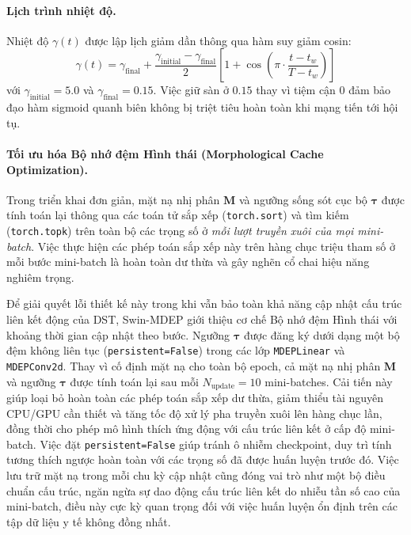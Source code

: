 \documentclass[11pt, a4paper]{article}
\begin{document}
\paragraph{Lịch trình nhiệt độ.}
Nhiệt độ $\gamma(t)$ được lập lịch giảm dần thông qua hàm suy giảm cosin:
\begin{equation}\label{eq:gamma_schedule}
    \gamma(t) = \gamma_{\text{final}} + \frac{\gamma_{\text{initial}} - \gamma_{\text{final}}}{2}\left[1 + \cos\!\left(\pi \cdot \frac{t - t_w}{T - t_w}\right)\right]
\end{equation}
với $\gamma_{\text{initial}} = 5.0$ và $\gamma_{\text{final}} = 0.15$. Việc giữ sàn ở $0.15$ thay vì tiệm cận $0$ đảm bảo đạo hàm sigmoid quanh biên không bị triệt tiêu hoàn toàn khi mạng tiến tới hội tụ.

\paragraph{Tối ưu hóa Bộ nhớ đệm Hình thái (Morphological Cache Optimization).}
Trong triển khai đơn giản, mặt nạ nhị phân $\bm{M}$ và ngưỡng sống sót cục bộ $\bm{\tau}$ được tính toán lại thông qua các toán tử sắp xếp (\texttt{torch.sort}) và tìm kiếm (\texttt{torch.topk}) trên toàn bộ các trọng số ở \emph{mỗi lượt truyền xuôi của mọi mini-batch}. Việc thực hiện các phép toán sắp xếp này trên hàng chục triệu tham số ở mỗi bước mini-batch là hoàn toàn dư thừa và gây nghẽn cổ chai hiệu năng nghiêm trọng.

Để giải quyết lỗi thiết kế này trong khi vẫn bảo toàn khả năng cập nhật cấu trúc liên kết động của DST, Swin-MDEP giới thiệu cơ chế Bộ nhớ đệm Hình thái với khoảng thời gian cập nhật theo bước. Ngưỡng $\bm{\tau}$ được đăng ký dưới dạng một bộ đệm không liên tục (\texttt{persistent=False}) trong các lớp \texttt{MDEPLinear} và \texttt{MDEPConv2d}. Thay vì cố định mặt nạ cho toàn bộ epoch, cả mặt nạ nhị phân $\bm{M}$ và ngưỡng $\bm{\tau}$ được tính toán lại sau mỗi $N_{\text{update}} = 10$ mini-batches. Cải tiến này giúp loại bỏ hoàn toàn các phép toán sắp xếp dư thừa, giảm thiểu tài nguyên CPU/GPU cần thiết và tăng tốc độ xử lý pha truyền xuôi lên hàng chục lần, đồng thời cho phép mô hình thích ứng động với cấu trúc liên kết ở cấp độ mini-batch. Việc đặt \texttt{persistent=False} giúp tránh ô nhiễm checkpoint, duy trì tính tương thích ngược hoàn toàn với các trọng số đã được huấn luyện trước đó. Việc lưu trữ mặt nạ trong mỗi chu kỳ cập nhật cũng đóng vai trò như một bộ điều chuẩn cấu trúc, ngăn ngừa sự dao động cấu trúc liên kết do nhiễu tần số cao của mini-batch, điều này cực kỳ quan trọng đối với việc huấn luyện ổn định trên các tập dữ liệu y tế không đồng nhất.
\end{document}
